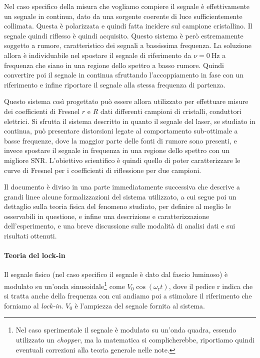 \documentclass[prb,showpacs,floatfix,altaffilletter,amsmath,amssymb,reprint,citeautoscript,showkeys]{revtex4-1}
\begin{document}
Nel caso specifico della misura che vogliamo compiere il segnale è effettivamente un segnale in continua, dato da una sorgente coerente di luce sufficientemente collimata. Questa è polarizzata e quindi fatta incidere sul campione cristallino. Il segnale quindi riflesso è quindi acquisito. Questo sistema è però estremamente soggetto a rumore, caratteristico dei segnali a bassissima frequenza. La soluzione allora è individuabile nel spostare il segnale di riferimento da $\nu=\SI{0}{\Hz}$ a frequenza che siano in una regione dello spettro a basso rumore. Quindi convertire poi il segnale in continua sfruttando l'accoppiamento in fase con un riferimento e infine riportare il segnale alla stessa frequenza di partenza. 

Questo sistema così progettato può essere allora utilizzato per effettuare misure dei coefficienti di Fresnel\cite{fresnelCalculationTintsThat2021,fresnelNoteCalculTeintes1821} $r$ e $R$ dati differenti campioni di cristalli, conduttori elettrici. Si sfrutta il sistema descritto in quanto il segnale del laser, se studiato in continua, può presentare distorsioni legate al comportamento sub-ottimale a basse frequenze, dove la maggior parte delle fonti di rumore sono presenti, e invece spostare il segnale in frequenza in una regione dello spettro con un migliore SNR. L'obiettivo scientifico è quindi quello di poter caratterizzare le curve di Fresnel per i coefficienti di riflessione per due campioni. 

Il documento è diviso in una parte immediatamente successiva che descrive a grandi linee alcune formalizzazioni del sistema utilizzato, a cui segue poi un dettaglio sulla teoria fisica del fenomeno studiato, per definire al meglio le osservabili in questione, e infine una descrizione e caratterizzazione dell'esperimento, e una breve discussione sulle modalità di analisi dati e sui risultati ottenuti. 

\paragraph*{Teoria del lock-in} 
Il segnale fisico (nel caso specifico il segnale è dato dal fascio luminoso) è modulato su un'onda sinusoidale\footnote{Nel caso sperimentale il segnale è modulato su un'onda quadra, essendo utilizzato un \emph{chopper}, ma la matematica si complicherebbe, riportiamo quindi eventuali correzioni alla teoria generale nelle note.} come $V_0 \cos(\omega_\mathrm{r} t)$, dove il pedice r indica che si tratta anche della frequenza con cui andiamo poi a stimolare il riferimento che forniamo al \emph{lock-in}. $V_0$ è l'ampiezza del segnale fornita al sistema. 
\end{document}
